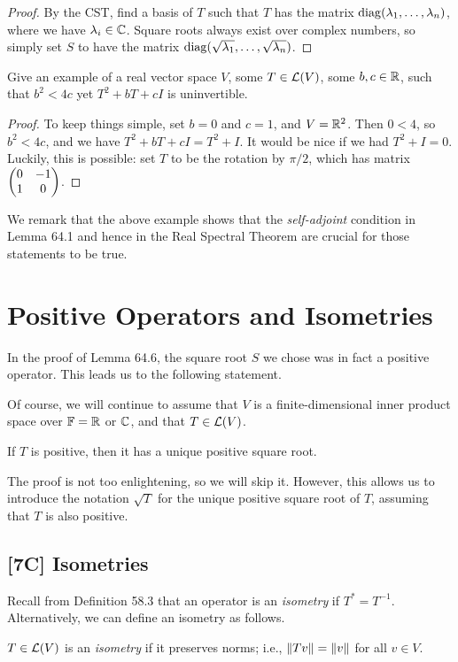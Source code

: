 \documentclass{article}
\begin{document}
\begin{proof}
By the CST, find a basis of $T$ such that $T$ has the matrix $\operatorname{diag}(\lambda_1, \ldots, \lambda_n)$, where we have $\lambda_i\in\mathbb C$. Square roots always exist over complex numbers, so simply set $S$ to have the matrix $\operatorname{diag}(\sqrt{\lambda_1}, \ldots, \sqrt{\lambda_n})$.
\end{proof}
\begin{example}
Give an example of a real vector space $V$, some $T\in\mathcal L(V)$, some $b,c\in\mathbb R$, such that $b^2 < 4c$ yet $T^2+bT+cI$ is uninvertible.
\end{example}
\begin{proof}
To keep things simple, set $b=0$ and $c=1$, and $V= 
\mathbb R^2$. Then $0<4$, so $b^2 <4c$, and we have $T^2 + bT + cI = T^2 + I$. It would be nice if we had $T^2 + I = 0$. Luckily, this is possible: set $T$ to be the rotation by $\pi/2$, which has matrix $\begin{pmatrix}0 & -1 \\ 1 & 0 \end{pmatrix}$.
\end{proof}
We remark that the above example shows that the \textit{self-adjoint} condition in Lemma 64.1 and hence in the Real Spectral Theorem are crucial for those statements to be true.

\section{Positive Operators and Isometries}
In the proof of Lemma 64.6, the square root $S$ we chose was in fact a positive operator. This leads us to the following statement.

Of course, we will continue to assume that $V$ is a finite-dimensional inner product space over $\mathbb F = \mathbb R$ or $\mathbb C$, and that $T\in\mathcal L(V)$.
\begin{lemma}
If $T$ is positive, then it has a unique positive square root.
\end{lemma}
The proof is not too enlightening, so we will skip it. However, this allows us to introduce the notation $\sqrt T$ for the unique positive square root of $T$, assuming that $T$ is also positive.
\subsection*{[7C] Isometries}
Recall from Definition 58.3 that an operator is an \textit{isometry} if $T^* = T^{-1}$. Alternatively, we can define an isometry as follows.
\begin{definition}
$T\in\mathcal L(V)$ is an \textit{isometry} if it preserves norms; i.e., $\left\Vert Tv\right\Vert = \left\Vert v\right\Vert$ for all $v\in V$.
\end{definition}
\end{document}
